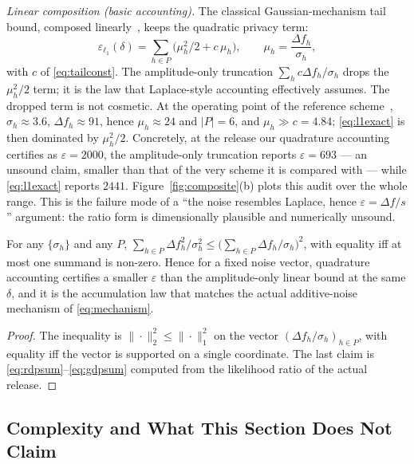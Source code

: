 \emph{Linear composition (basic accounting).} The classical Gaussian-mechanism
tail bound, composed linearly~\cite{dwork2014}, keeps the quadratic privacy
term:
\begin{equation}
\varepsilon_{\ell_1}(\delta)=\sum_{h\in P}\Big(\mu_h^{2}/2+c\,\mu_h\Big),
\qquad \mu_h=\frac{\Delta f_h}{\sigma_h},
\label{eq:l1exact}
\end{equation}
with $c$ of \eqref{eq:tailconst}. The amplitude-only truncation
$\sum_hc\Delta f_h/\sigma_h$ drops the $\mu_h^{2}/2$ term; it is the law that
Laplace-style accounting effectively assumes. The dropped term is not cosmetic.
At the operating point of the reference scheme~\cite{arXiv2510},
$\sigma_h\approx3.6$,
$\Delta f_h\approx91$, hence $\mu_h\approx24$ and $|P|=6$, and $\mu_h\gg c=4.84$;
\eqref{eq:l1exact} is then dominated by $\mu_h^2/2$. Concretely, at the
release our quadrature accounting certifies as $\varepsilon=2000$, the
amplitude-only truncation reports $\varepsilon=693$ --- an unsound claim,
smaller than that of the very scheme it is compared with --- while
\eqref{eq:l1exact} reports $2441$.
Figure~\ref{fig:composite}(b) plots this audit over the whole range. This is
the failure mode of a ``the noise resembles Laplace, hence
$\varepsilon=\Delta f/s$'' argument: the ratio form is dimensionally plausible
and numerically unsound.

\begin{proposition}
\label{pr:quadrature}
For any $\{\sigma_h\}$ and any $P$,
$\sum_{h\in P}\Delta f_h^{2}/\sigma_h^{2}
\le\big(\sum_{h\in P}\Delta f_h/\sigma_h\big)^{2}$, with equality iff at most
one summand is non-zero. Hence for a fixed noise vector, quadrature accounting
certifies a smaller $\varepsilon$ than the amplitude-only linear bound at the
same $\delta$, and it is the accumulation law that matches the actual
additive-noise mechanism of \eqref{eq:mechanism}.
\end{proposition}

\begin{proof}
The inequality is $\|\cdot\|_2^2\le\|\cdot\|_1^2$ on the vector
$(\Delta f_h/\sigma_h)_{h\in P}$, with equality iff the vector is supported on
a single coordinate. The last claim is \eqref{eq:rdpsum}--\eqref{eq:gdpsum}
computed from the likelihood ratio of the actual release.
\end{proof}

\subsection{Complexity and What This Section Does Not Claim}

